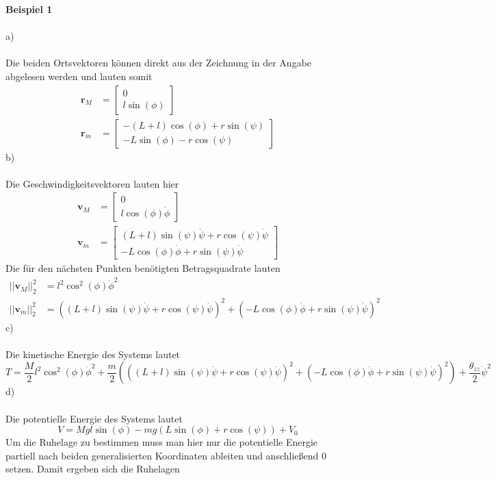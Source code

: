 \textbf{Beispiel 1}\\ \\
a)\\ \\
Die beiden Ortsvektoren können direkt aus der Zeichnung in der Angabe abgelesen werden und lauten somit
\begin{align*}
	\textbf{r}_M &= \begin{bmatrix}
		0 \\
		l\sin(\phi)
	\end{bmatrix}
	\\
	\textbf{r}_m &= \begin{bmatrix}
		-(L + l)\cos(\phi) + r\sin(\psi) \\
		-L\sin(\phi) - r\cos(\psi)
	\end{bmatrix}
\end{align*}
b)\\ \\
Die Geschwindigkeitsvektoren lauten hier
\begin{align*}
	\textbf{v}_M &= \begin{bmatrix}
		0 \\
		l\cos(\phi)\dot{\phi}
	\end{bmatrix}
	\\
	\textbf{v}_m &= \begin{bmatrix}
		(L + l)\sin(\psi)\dot{\psi} + r\cos(\psi)\dot{\psi} \\
		-L\cos(\phi)\dot{\phi} + r\sin(\psi)\dot{\psi}
	\end{bmatrix}
\end{align*}
Die für den nächsten Punkten benötigten Betragsquadrate lauten
\begin{align*}
	||\textbf{v}_M||_2^2 &= l^2\cos^2(\phi)\dot{\phi}^2 \\
	||\textbf{v}_m||_2^2 &= ((L + l)\sin(\psi)\dot{\psi} + r\cos(\psi)\dot{\psi})^2 + (-L\cos(\phi)\dot{\phi} + r\sin(\psi)\dot{\psi})^2
\end{align*}
c) \\ \\
Die kinetische Energie des Systems lautet
\[
	T = \frac{M}{2}l^2\cos^2(\phi)\dot{\phi}^2 + \frac{m}{2}\left(((L + l)\sin(\psi)\dot{\psi} + r\cos(\psi)\dot{\psi})^2 + (-L\cos(\phi)\dot{\phi} + r\sin(\psi)\dot{\psi})^2\right) + \frac{\theta_{zz}}{2}\dot{\psi}^2
\]
d)\\ \\
Die potentielle Energie des Systems lautet
\[
	V = Mgl\sin(\phi) - mg(L\sin(\phi) + r\cos(\psi)) + V_0
\]
Um die Ruhelage zu bestimmen muss man hier nur die potentielle Energie partiell nach beiden generalisierten Koordinaten ableiten und anschließend 0 setzen. Damit ergeben sich die Ruhelagen
